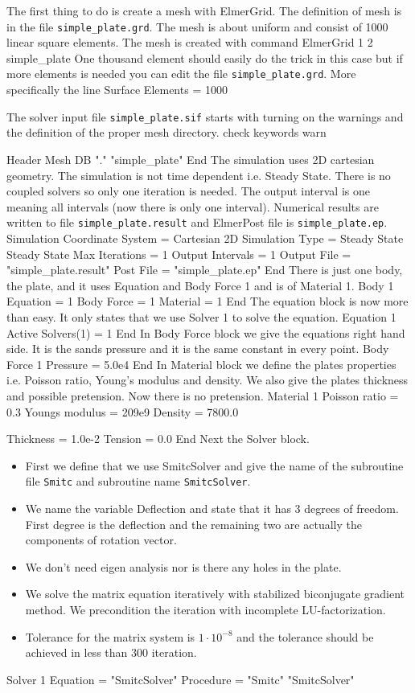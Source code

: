 The first thing to do is create a mesh with ElmerGrid.
The definition of mesh is in the file \texttt{simple\_plate.grd}.
The mesh is about uniform and consist of 1000 linear square elements.
The mesh is created with command
\ttbegin
ElmerGrid 1 2 simple_plate
\ttend
One thousand element should easily do the trick in this case
but if more elements is needed you can edit the file 
\texttt{simple\_plate.grd}.
More specifically the line
\ttbegin
Surface Elements = 1000
\ttend

The solver input file \texttt{simple\_plate.sif} starts with turning on 
the warnings and the definition of the proper mesh directory. 
%
\ttbegin
check keywords warn

Header
  Mesh DB "." "simple_plate"
End
\ttend
The simulation uses 2D cartesian geometry. The simulation is not
time dependent i.e. Steady State. 
There is no coupled solvers so only one iteration is needed. 
The output interval is one meaning all intervals (now there is only one
interval). Numerical results are written to file \texttt{simple\_plate.result}
and ElmerPost file is \texttt{simple\_plate.ep}.
\ttbegin
Simulation
  Coordinate System = Cartesian 2D
  Simulation Type = Steady State
  Steady State Max Iterations = 1
  Output Intervals = 1
  Output File = "simple_plate.result"
  Post File = "simple_plate.ep"
End
\ttend
There is just one body, the plate, and it uses Equation and  Body Force 1 and
is of Material 1.
\ttbegin
Body 1
  Equation = 1
  Body Force = 1
  Material = 1
End
\ttend
The equation block is now more than easy. 
It only states that we use Solver 1 to solve the equation.
\ttbegin
Equation 1
  Active Solvers(1) = 1
End
\ttend
In Body Force block we give the equations right hand side. 
It is the sands pressure and it is the same constant in every point.
\ttbegin
Body Force 1
  Pressure = 5.0e4
End
\ttend
In Material block we define the plates properties i.e. Poisson ratio,
Young's modulus and density. We also give the plates thickness and
possible pretension. Now there is no pretension.
\ttbegin
Material 1   
  Poisson ratio = 0.3
  Youngs modulus = 209e9
  Density = 7800.0

  Thickness = 1.0e-2
  Tension = 0.0
End
\ttend
Next the Solver block.
\begin{itemize}
\item First we define that we use SmitcSolver  
and give the name of the subroutine file \texttt{Smitc} and
subroutine name \texttt{SmitcSolver}. 
\item We name the variable Deflection and state that it has 3 degrees of freedom. 
First degree is the deflection and the remaining two are actually 
the components of rotation vector. 
\item We don't need eigen analysis nor is there any holes in the plate. 
\item We solve the matrix equation iteratively with stabilized biconjugate 
gradient method. We precondition the iteration with incomplete 
LU-factorization. 
\item Tolerance for the matrix system is $1\cdot10^{-8}$
and the tolerance should be achieved in less than 300 iteration.
\end{itemize}
\ttbegin
Solver 1
  Equation = "SmitcSolver"
  Procedure = "Smitc" "SmitcSolver"

